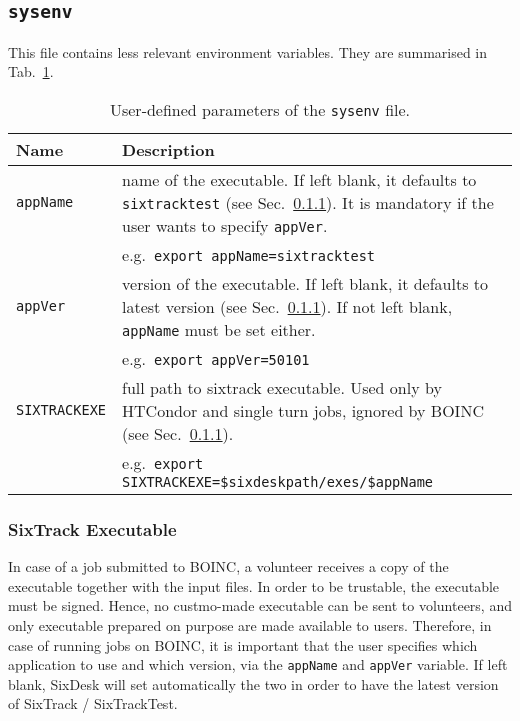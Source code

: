 \subsection{\texttt{sysenv}}\label{Sec:InputFiles:sysenv}
This file contains less relevant environment variables.
They are summarised in Tab.~\ref{tab:sysenv}.
\begin{table}[h]
\begin{center}
    \caption{User-defined parameters of the \texttt{sysenv} file.}
    \label{tab:sysenv}
    \begin{tabular}{|p{3cm}|p{12cm}|}
    \hline
    \rowcolor{blue!30}
    \textbf{Name} & \textbf{Description} \\
    \hline
    \texttt{appName} & name of the executable.
    If left blank, it defaults to \texttt{sixtracktest} (see Sec.~\ref{Sec:SixTrackExes}).
    It is mandatory if the user wants to specify \texttt{appVer}. \\
    & e.g.~\texttt{export appName=sixtracktest} \\
    \hline
    \texttt{appVer} & version of the executable.
    If left blank, it defaults to latest version (see Sec.~\ref{Sec:SixTrackExes}).
    If not left blank, \texttt{appName} must be set either. \\
    & e.g.~\texttt{export appVer=50101} \\
    \hline
    \texttt{SIXTRACKEXE} & full path to sixtrack executable.
    Used only by HTCondor and single turn jobs, ignored by BOINC
    (see Sec.~\ref{Sec:SixTrackExes}). \\
    & e.g.~\texttt{export SIXTRACKEXE=\$sixdeskpath/exes/\$appName} \\
    \hline
    \end{tabular}
\end{center}
\end{table}

\subsubsection{SixTrack Executable}\label{Sec:SixTrackExes}
In case of a job submitted to BOINC, a volunteer receives
a copy of the executable together with the input
files. In order to be trustable, the executable must be signed.
Hence, no custmo-made executable can be sent to volunteers, and
only executable prepared on purpose are made available to users.
Therefore, in case of running jobs on BOINC, it is important
that the user specifies which application to use and which version,
via the \texttt{appName} and \texttt{appVer} variable. If left
blank, SixDesk will set automatically the two in order to have
the latest version of SixTrack / SixTrackTest.

